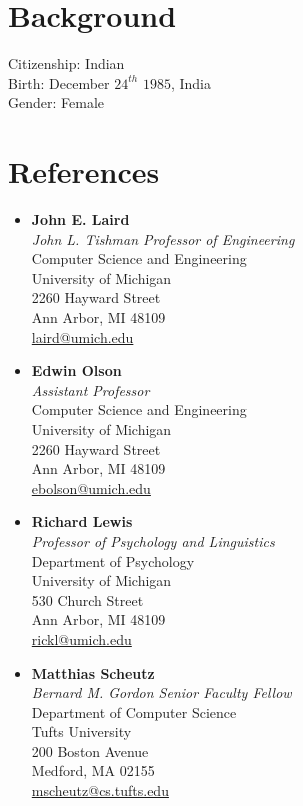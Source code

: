 \documentclass[margin,line,11pt]{res}
\begin{document}
\begin{resume}
\section{\sc Background}
Citizenship: Indian \\
Birth: December $24^{th}$ $1985$, India \\
Gender: Female


\pagebreak
\section{\sc References}
\vspace{-0.02cm}
\begin{multicols}{2}
\begin{itemize}
\item \textbf{John E. Laird} \\
  \emph{John L. Tishman Professor of Engineering} \\
  Computer Science and Engineering \\ 
  University of Michigan\\
  2260 Hayward Street\\
  Ann Arbor, MI 48109\\
  \href{mailto:laird@umich.edu}{laird@umich.edu}
\item \textbf{Edwin Olson} \\
  \emph{Assistant Professor} \\
  Computer Science and Engineering \\ 
  University of Michigan\\
  2260 Hayward Street\\
  Ann Arbor, MI 48109\\
  \href{mailto:ebolson@umich.edu}{ebolson@umich.edu}
\item \textbf{Richard Lewis} \\
  \emph{Professor of Psychology and Linguistics} \\
  Department of Psychology \\ 
  University of Michigan\\
  530 Church Street\\
  Ann Arbor, MI 48109\\
  \href{mailto:rickl@umich.edu}{rickl@umich.edu} \\
\item \textbf{Matthias Scheutz} \\
  \emph{Bernard M. Gordon Senior Faculty Fellow} \\
  Department of Computer Science\\
  Tufts University\\
  200 Boston Avenue\\
  Medford, MA 02155\\
  \href{mailto:mscheutz@cs.tufts.edu}{mscheutz@cs.tufts.edu}
\end{itemize}
\end{multicols} \hfill
\end{resume}
\end{document}
